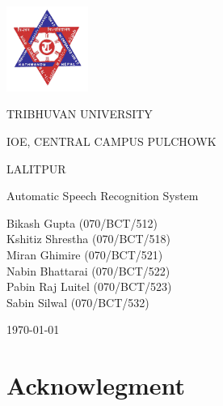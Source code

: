 \documentclass[a4paper,12pt,onepage]{article}
\begin{document}
\begin{titlepage}
  \centering
  \includegraphics[width=0.2\textwidth]{tu_logo.png}\par%
  {\textsc\LARGE TRIBHUVAN UNIVERSITY \par}
  {\textsc\LARGE IOE, CENTRAL CAMPUS PULCHOWK \par}
  {\textsc\LARGE LALITPUR \par}
  \vspace{1cm}
	{\LARGE\textsc Automatic Speech Recognition System\par}
	\vspace{3cm}
        {
          {\Large Bikash Gupta (070/BCT/512)}\\
          \vspace{0.1cm}
          {\Large Kshitiz Shrestha (070/BCT/518)}\\
          \vspace{0.1cm}
          {\Large Miran Ghimire (070/BCT/521)}\\
          \vspace{0.1cm}
          {\Large Nabin Bhattarai (070/BCT/522)}\\
          \vspace{0.1cm}
          {\Large Pabin Raj Luitel (070/BCT/523)}\\
          \vspace{0.1cm}
          {\Large Sabin Silwal (070/BCT/532)}\\
          \vspace{0.1cm}
        }
	\vspace{1cm}

	\vfill

	{\large \today\par}
\end{titlepage}
\setcounter{page}{2}
\section*{Acknowlegment}
\end{document}
